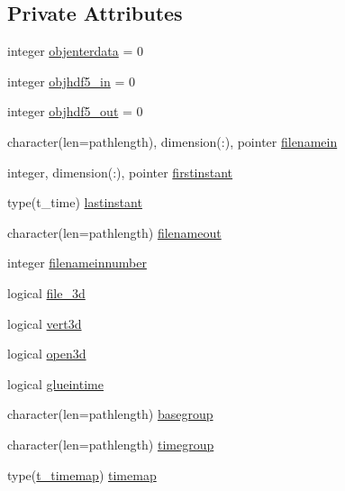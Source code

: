 \subsection*{Private Attributes}
\begin{DoxyCompactItemize}
\item 
integer \mbox{\hyperlink{structmodulegluehdf5files_1_1t__gluehdf5files_afb99d3503b3b56b88cd2e069d84b5e4f}{objenterdata}} = 0
\item 
integer \mbox{\hyperlink{structmodulegluehdf5files_1_1t__gluehdf5files_aa446627d70d550d712b20d548dcaa21c}{objhdf5\+\_\+in}} = 0
\item 
integer \mbox{\hyperlink{structmodulegluehdf5files_1_1t__gluehdf5files_a320737c68679f1bdd45d6bea0fb4a247}{objhdf5\+\_\+out}} = 0
\item 
character(len=pathlength), dimension(\+:), pointer \mbox{\hyperlink{structmodulegluehdf5files_1_1t__gluehdf5files_ae93452d06155cfaac7a362fa9e93b700}{filenamein}}
\item 
integer, dimension(\+:), pointer \mbox{\hyperlink{structmodulegluehdf5files_1_1t__gluehdf5files_af81a4708b437ee623d7cecb0c8bee2e6}{firstinstant}}
\item 
type(t\+\_\+time) \mbox{\hyperlink{structmodulegluehdf5files_1_1t__gluehdf5files_a161631e34699730a04a52d7d0dd664b9}{lastinstant}}
\item 
character(len=pathlength) \mbox{\hyperlink{structmodulegluehdf5files_1_1t__gluehdf5files_ad8bad5b50ac5302d65d00f8182ad012b}{filenameout}}
\item 
integer \mbox{\hyperlink{structmodulegluehdf5files_1_1t__gluehdf5files_a3b2aa34ff18db5d9a61f05df5ef3e545}{filenameinnumber}}
\item 
logical \mbox{\hyperlink{structmodulegluehdf5files_1_1t__gluehdf5files_a5a75e5641d7b78791c819c09144ee22b}{file\+\_\+3d}}
\item 
logical \mbox{\hyperlink{structmodulegluehdf5files_1_1t__gluehdf5files_adfea8b2b0f6f803ce35a61553f4ef2ab}{vert3d}}
\item 
logical \mbox{\hyperlink{structmodulegluehdf5files_1_1t__gluehdf5files_add782f57574922ccb1d80e909c35343c}{open3d}}
\item 
logical \mbox{\hyperlink{structmodulegluehdf5files_1_1t__gluehdf5files_a898ab3ff9af519400d51aca7bc34aa13}{glueintime}}
\item 
character(len=pathlength) \mbox{\hyperlink{structmodulegluehdf5files_1_1t__gluehdf5files_ab9a95b9e1116003c8f4d139419e0b616}{basegroup}}
\item 
character(len=pathlength) \mbox{\hyperlink{structmodulegluehdf5files_1_1t__gluehdf5files_a73942b18809dc9005008a1f7c185ed54}{timegroup}}
\item 
type(\mbox{\hyperlink{structmodulegluehdf5files_1_1t__timemap}{t\+\_\+timemap}}) \mbox{\hyperlink{structmodulegluehdf5files_1_1t__gluehdf5files_abf43368bf1ab2e04a4cb3431c7cf60d0}{timemap}}
\end{DoxyCompactItemize}


